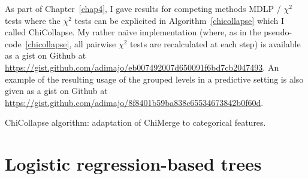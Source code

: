 As part of Chapter~\ref{chap4}, I gave results for competing methods MDLP / $\chi^2$ tests where the $\chi^2$ tests can be explicited in Algorithm~\ref{chicollapse} which I called ChiCollapse. My rather na{\"\i}ve implementation (where, as in the pseudo-code~\ref{chicollapse}, all pairwise $\chi^2$ tests are recalculated at each step) is available as a gist on Github at \url{https://gist.github.com/adimajo/eb007492007d650091f6bd7cb2047493}. An example of the resulting usage of the grouped levels in a predictive setting is also given as a gist on Github at \url{https://gist.github.com/adimajo/8f8401b59ba838c65534673842b0f60d}.

\begin{algorithm}[H]
 \KwResult{$\hat{\q}$}
 \caption{\label{chicollapse} ChiCollapse algorithm: adaptation of ChiMerge to categorical features.}
\end{algorithm}





\section{Logistic regression-based trees}


